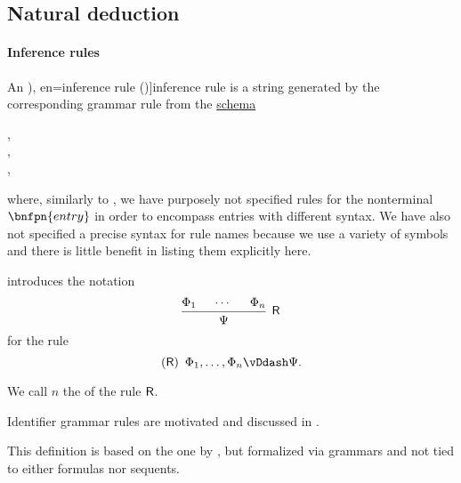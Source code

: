 \subsection{Natural deduction}\label{subsec:natural_deduction}

\paragraph{Inference rules}

\begin{definition}\label{def:inference_rule}\mimprovised
  An \term[ru=правило вывода (\cite[31]{Герасимов2011}), en=inference rule (\cite[2]{MartinLof1996Meanings})]{inference rule} is a string generated by the corresponding grammar rule from the \hyperref[def:formal_grammar/schema]{schema}
  \begin{bnf*}
         { \bnfor {} \bnfsp \bnftsq{,} \bnfsp {}}, \\
           {\bnfes \bnfor {} \bnfor {}}, \\
         {}, \\
     {\bnftsq{(} \bnfsp {} \bnfsp \bnftsq{)} \bnfsp {} \bnfsp \bnftsq{\( \vDdash \)} \bnfsp {}}
  \end{bnf*}
  where, similarly to , we have purposely not specified rules for the nonterminal \( \bnfpn{entry} \) in order to encompass entries with different syntax. We have also not specified a precise syntax for rule names because we use a variety of symbols and there is little benefit in listing them explicitly here.

   introduces the notation
  \begin{equation*}
    \begin{prooftree}
      \hypo{ \Phi_1 }
      \hypo{ \cdots }
      \hypo{ \Phi_n }
      \infer3[\logic{R}]{ \Psi }
    \end{prooftree}
  \end{equation*}
  for the rule
  \begin{equation*}
    (\logic{R}) \enspace \Phi_1, \ldots, \Phi_n \vDdash \Psi.
  \end{equation*}

  We call \( n \) the  of the rule \( \textsf{R} \).
\end{definition}
\begin{comments}
  \item Identifier grammar rules are motivated and discussed in .
  \item This definition is based on the one by , but formalized via grammars and not tied to either formulas nor sequents.
\end{comments}

